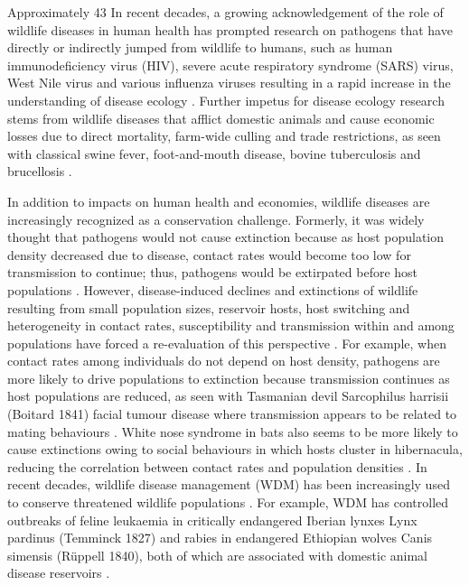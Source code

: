 Approximately 43%
In recent decades, a growing acknowledgement of the role of wildlife diseases in human health has prompted research on pathogens that have directly or indirectly jumped from wildlife to humans, such as human immunodeficiency virus (HIV), severe acute respiratory syndrome (SARS) virus, West Nile virus and various influenza viruses resulting in a rapid increase in the understanding of disease ecology \citep{hudson2002ecology, ostfeld2010infectious, wobeser2013investigation}.
Further impetus for disease ecology research stems from wildlife diseases that afflict domestic animals and cause economic losses due to direct mortality, farm-wide culling and trade restrictions, as seen with classical swine fever, foot-and-mouth disease, bovine tuberculosis and brucellosis \citep{Keeling2001, Schnyder2002, Woodroffe2006, Cross2007b}.

In addition to impacts on human health and economies, wildlife diseases are increasingly recognized as a conservation challenge.
Formerly, it was widely thought that pathogens would not cause extinction because as host population density decreased due to disease, contact rates would become too low for transmission to continue; thus, pathogens would be extirpated before host populations \citep{may1979population}.
However, disease-induced declines and extinctions of wildlife resulting from small population sizes, reservoir hosts, host switching and heterogeneity in contact rates, susceptibility and transmission within and among populations have forced a re-evaluation of this perspective \citep{DeCastro2005b}.
For example, when contact rates among individuals do not depend on host density, pathogens are more likely to drive populations to extinction because transmission continues as host populations are reduced, as seen with Tasmanian devil Sarcophilus harrisii (Boitard 1841) facial tumour disease where transmission appears to be related to mating behaviours \citep{mccallum2012disease}.
White nose syndrome in bats also seems to be more likely to cause extinctions owing to social behaviours in which hosts cluster in hibernacula, reducing the correlation between contact rates and population densities \citep{Langwig2012a}.
In recent decades, wildlife disease management (WDM) has been increasingly used to conserve threatened wildlife populations \citep{Deem2001}.
For example, WDM has controlled outbreaks of feline leukaemia in critically endangered Iberian lynxes Lynx pardinus (Temminck 1827) and rabies in endangered Ethiopian wolves Canis simensis (Rüppell 1840), both of which are associated with domestic animal disease reservoirs \citep{Haydon2006, Lopez2009b}.

